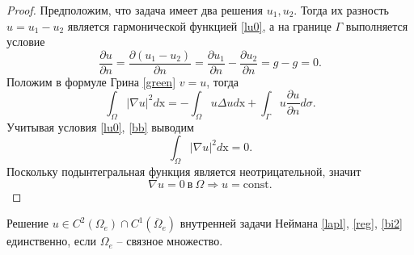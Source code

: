     \begin{proof}
        Предположим, что задача имеет два решения $u_1, u_2$. Тогда их разность $u = u_1 - u_2$ является гармонической функцией \eqref{lu0}, а на границе $\Gamma$ выполняется условие
        \begin{equation}
            \frac{\partial u}{\partial n} = \frac{\partial (u_1 - u_2)}{\partial n} = \frac{\partial u_1}{\partial n} - \frac{\partial u_2}{\partial n} = g - g = 0. \tag{$bb$} \label{bb}
        \end{equation}
        Положим в формуле Грина \eqref{green} $ v = u $, тогда
        \begin{equation}
            \int_\Omega | \nabla u |^2 d\mathrm{x} = -\int_\Omega u \Delta u d\mathrm{x} + \int_\Gamma u \frac{\partial u}{\partial n} d\sigma. \label{green_uu}
        \end{equation}
        Учитывая условия \eqref{lu0}, \eqref{bb} выводим
        \begin{equation}
            \int_\Omega | \nabla u |^2 d\mathrm{x} = 0. \label{green_sub}
        \end{equation}
        Поскольку подынтегральная функция является неотрицательной, значит
        $$ \nabla u = 0 ~\text{в} ~ \Omega \Rightarrow u = \mathrm{const}. $$
    \end{proof}

    \begin{theorem}
        Решение \(u \in C^2 (\Omega_e)  \cap C^1 ( \overline{\Omega}_e )  \) внутренней задачи Неймана \eqref{lapl}, \eqref{reg}, \eqref{bi2} единственно, если $\Omega_e$ -- связное множество.
    \end{theorem}

